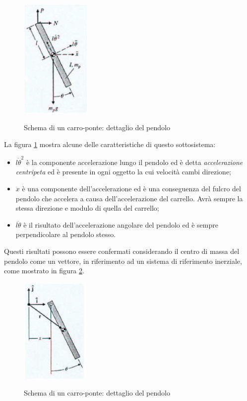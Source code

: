\documentclass[a4paper]{report}
\begin{document}
\begin{figure}[!h]
  \centering
  \includegraphics[width=0.3\textwidth]{./images/carroponte-pendolo-a.png}
  \label{fig:carroponte-pendolo-a}
  \caption{Schema di un carro-ponte: dettaglio del pendolo\label{fig:carroponte-pendolo-a}}
\end{figure}
La figura \ref{fig:carroponte-pendolo-a} mostra alcune delle
caratteristiche di questo sottosistema:
\begin{itemize}
\item $l \dot{\theta}^2$ \`e la componente accelerazione lungo il
  pendolo ed \`e detta {\em accelerazione
    centripeta} ed \`e presente in
  ogni oggetto la cui velocit\`a cambi direzione;
\item $\ddot{x}$ \`e una componente dell'accelerazione ed \`e una
  conseguenza del fulcro del pendolo che accelera a causa
  dell'accelerazione del carrello. Avr\`a sempre la stessa direzione e
  modulo di quella del carrello;
\item $l \ddot{\theta}$ \`e il risultato dell'accelerazione angolare
  del pendolo ed \`e sempre perpendicolare al pendolo stesso.
\end{itemize}
Questi risultati possono essere confermati considerando il centro di
massa del pendolo come un vettore, in riferimento ad un sistema di
riferimento inerziale, come mostrato in figura \ref{fig:carroponte-pendolo-b}.
\begin{figure}[!h]
  \centering
  \includegraphics[width=0.3\textwidth]{./images/carroponte-pendolo-b.png}
  \label{fig:carroponte-pendolo-b}
  \caption{Schema di un carro-ponte: dettaglio del pendolo\label{fig:carroponte-pendolo-b}}
\end{figure}
\end{document}

